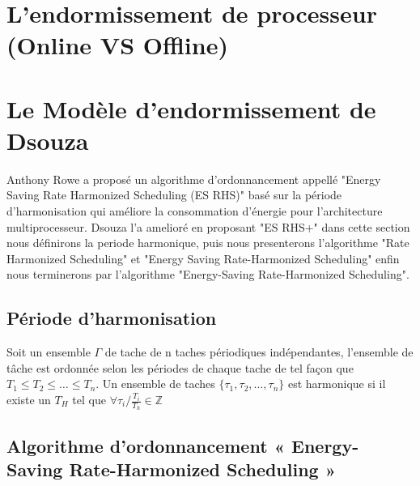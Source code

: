 \section{L'endormissement de processeur (Online VS Offline)}
\vspace{-1cm}
\section{Le Modèle d'endormissement de Dsouza}
\vspace{-1cm}
Anthony Rowe a proposé un algorithme d’ordonnancement appellé "Energy Saving Rate Harmonized Scheduling (ES RHS)" \cite{Rowe10} basé sur la période d’harmonisation qui améliore la consommation d’énergie pour l’architecture multiprocesseur.
Dsouza l'a amelioré en proposant "ES RHS+" dans cette section nous définirons la periode harmonique, puis nous presenterons l'algorithme "Rate Harmonized Scheduling" et "Energy Saving Rate-Harmonized Scheduling" enfin nous terminerons par l'algorithme "Energy-Saving Rate-Harmonized Scheduling".

\subsection{Période d’harmonisation}

Soit un ensemble $\Gamma$ de tache de n taches périodiques indépendantes, l’ensemble de tâche est ordonnée selon les périodes de chaque tache de tel façon que $T_1 \leq T_2 \leq \dots \leq T_n$. 
Un ensemble de taches $\{\tau_1, \tau_2, \dots, \tau_n \}$ est harmonique si il existe un $T_H$ tel que $\forall \tau_i / \frac{T_i}{T_h} \in \mathbb{Z}$

\subsection{Algorithme d’ordonnancement « Energy-Saving Rate-Harmonized Scheduling »}

